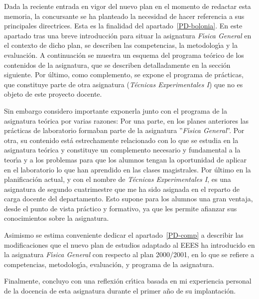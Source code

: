Dada la reciente entrada en vigor del nuevo plan en el momento de redactar esta 
memoria, la concursante se ha planteado la necesidad de hacer referencia a sus 
principales directrices.
Esta es la finalidad del 
 apartado~\ref{PD-bolonia}. En este apartado 
tras una breve introducci\'{o}n para situar la asignatura
{\it F\'{\i}sica General} en el contexto de dicho plan,
se describen las competencias, la metodolog\'{\i}a y la evaluaci\'{o}n.
A continuaci\'{o}n se muestra un esquema del programa te\'{o}rico 
de los contenidos de la asignatura, 
que se describen detalladamente en la  secci\'{o}n 
siguiente. Por \'{u}ltimo, como complemento, se expone
 el programa de pr\'{a}cticas, que constituye parte de otra asignatura 
({\it  T\'{e}cnicas Experimentales I}) que no 
es objeto de este proyecto docente. 

Sin embargo  considero importante
exponerla junto con el programa de la asignatura te\'{o}rica por varias razones:
Por una parte, en los planes anteriores las pr\'{a}cticas de laboratorio formaban parte de la 
asignatura ''{\it F\'{\i}sica General}''.  Por otra,
 su contenido est\'{a} estrechamente 
relacionado con lo que se estudia en la asignatura te\'{o}rica 
y constituye un complemento necesario y fundamental  a la teor\'{\i}a 
y a los problemas para que los alumnos tengan la oportunidad de 
 aplicar en el laboratorio
lo que han aprendido en las clases magistrales.
Por \'{u}ltimo en la planificaci\'{o}n actual, y con el nombre de 
{\it  T\'{e}cnicas Experimentales I}, es una asignatura de segundo cuatrimestre
que  me ha sido asignada en el reparto de carga docente del departamento. Esto 
supone  para los alumnos  una gran ventaja,  desde el 
punto de vista pr\'{a}ctico y formativo,
ya que les permite afianzar sus conocimientos sobre la asignatura.



Asimismo 
se estima conveniente dedicar
 el apartado~\ref{PD-comp}
a describir las modificaciones que el nuevo plan de estudios adaptado 
al EEES ha introducido en la asignatura {\it  F\'{\i}sica General}
con respecto al plan 2000/2001, en lo que se refiere a competencias,
 metodolog\'{\i}a,  evaluaci\'{o}n, y  programa de la asignatura. 

Finalmente, concluyo con una  reflexi\'{o}n cr\'{\i}tica basada en
 mi experiencia personal de la docencia de esta asignatura durante el primer a\~no de su implantaci\'{o}n.



